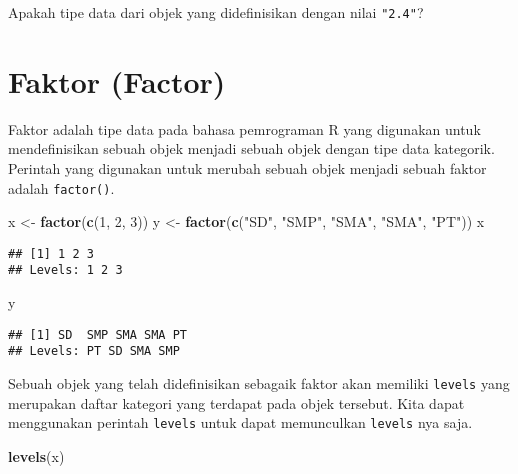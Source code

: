 \documentclass[
]{book}
\newenvironment{Shaded}{\begin{snugshade}}{\end{snugshade}}
\newcommand{\DecValTok}[1]{\textcolor[rgb]{0.00,0.00,0.81}{#1}}
\newcommand{\KeywordTok}[1]{\textcolor[rgb]{0.13,0.29,0.53}{\textbf{#1}}}
\newcommand{\NormalTok}[1]{#1}
\newcommand{\StringTok}[1]{\textcolor[rgb]{0.31,0.60,0.02}{#1}}
\begin{document}
Apakah tipe data dari objek yang didefinisikan dengan nilai \texttt{"2.4"}?

\hypertarget{factor}{%
\section{Faktor (Factor)}\label{factor}}

Faktor adalah tipe data pada bahasa pemrograman R yang digunakan untuk mendefinisikan sebuah objek menjadi sebuah objek dengan tipe data kategorik. Perintah yang digunakan untuk merubah sebuah objek menjadi sebuah faktor adalah \texttt{factor()}.

\begin{Shaded}
\begin{Highlighting}[]
\NormalTok{x <-}\StringTok{ }\KeywordTok{factor}\NormalTok{(}\KeywordTok{c}\NormalTok{(}\DecValTok{1}\NormalTok{, }\DecValTok{2}\NormalTok{, }\DecValTok{3}\NormalTok{))}
\NormalTok{y <-}\StringTok{ }\KeywordTok{factor}\NormalTok{(}\KeywordTok{c}\NormalTok{(}\StringTok{"SD"}\NormalTok{, }\StringTok{"SMP"}\NormalTok{, }\StringTok{"SMA"}\NormalTok{, }\StringTok{"SMA"}\NormalTok{, }\StringTok{"PT"}\NormalTok{))}
\NormalTok{x}
\end{Highlighting}
\end{Shaded}

\begin{verbatim}
## [1] 1 2 3
## Levels: 1 2 3
\end{verbatim}

\begin{Shaded}
\begin{Highlighting}[]
\NormalTok{y}
\end{Highlighting}
\end{Shaded}

\begin{verbatim}
## [1] SD  SMP SMA SMA PT 
## Levels: PT SD SMA SMP
\end{verbatim}

Sebuah objek yang telah didefinisikan sebagaik faktor akan memiliki \texttt{levels} yang merupakan daftar kategori yang terdapat pada objek tersebut. Kita dapat menggunakan perintah \texttt{levels} untuk dapat memunculkan \texttt{levels} nya saja.

\begin{Shaded}
\begin{Highlighting}[]
\KeywordTok{levels}\NormalTok{(x)}
\end{Highlighting}
\end{Shaded}
\end{document}
